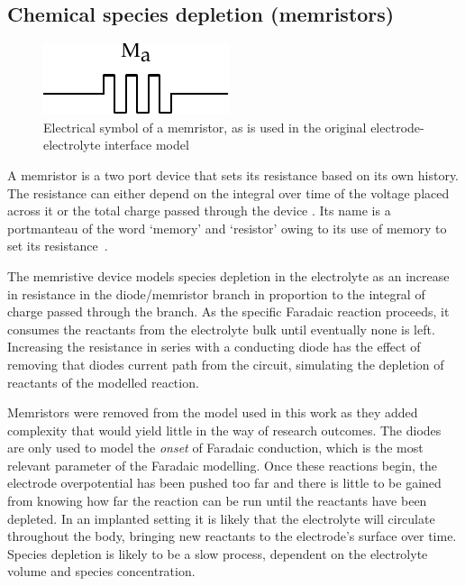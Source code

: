   \subsection{Chemical species depletion (memristors)}


    \begin{figure}[ht]
      \centering
      \includegraphics{content/pt2/07-InterfaceModel/graphics/memristorSymbol}
      \caption{\label{fig:pt2-memristorSymbol}Electrical symbol of a memristor, as is used in the original electrode-electrolyte interface model}
    \end{figure}

    A memristor is a two port device that sets its resistance based on its own history.
    The resistance can either depend on the integral over time of the voltage placed across it or the total charge passed through the device \cite{Kvatinsky2012}.
    Its name is a portmanteau of the word `memory' and `resistor' owing to its use of memory to set its resistance~\cite{Williams2008}.

    The memristive device models species depletion in the electrolyte as an increase in resistance in the diode/memristor branch in proportion to the integral of charge passed through the branch.
    As the specific Faradaic reaction proceeds, it consumes the reactants from the electrolyte bulk until eventually none is left.
    Increasing the resistance in series with a conducting diode has the effect of removing that diodes current path from the circuit, simulating the depletion of reactants of the modelled reaction.

    Memristors were removed from the model used in this work as they added complexity that would yield little in the way of research outcomes.
    The diodes are only used to model the \emph{onset} of Faradaic conduction, which is the most relevant parameter of the Faradaic modelling.
    Once these reactions begin, the electrode overpotential has been pushed too far and there is little to be gained from knowing how far the reaction can be run until the reactants have been depleted.
    In an implanted setting it is likely that the electrolyte will circulate throughout the body, bringing new reactants to the electrode's surface over time.
    Species depletion is likely to be a slow process, dependent on the electrolyte volume and species concentration.

